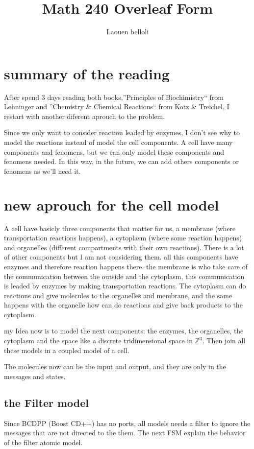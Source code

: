 \documentclass[12pt]{article}
\title{Math 240 Overleaf Form}
\author {Laouen belloli}
\begin{document}
\section*{summary of the reading}
After spend 3 days reading both books,''Principles of Biochimistry`` from Lehninger and ''Chemistry \& Chemical Reactions``  from Kotz \& Treichel, I restart with another diferent aprouch to the problem.

Since we only want to consider reaction leaded by enzymes, I don't see why to model the reactions instead of model the cell components. A cell have many components and fenomens, but we can only model these components and fenomens needed. In this way, in the future, we can add others components or fenomens as we'll need it.


\section*{new aprouch for the cell model}  
A cell have basicly three components that matter for us, a membrane (where transportation reactions happens), a cytoplasm (where some reaction happens) and organelles (different compartments with their own reactions).
There is a lot of other components but I am not considering them.
all this components have enzymes and therefore reaction happens there. the membrane is who take care of the communication between the outside and the cytoplasm, this communication is leaded by enzymes by making transportation reactions. The cytoplasm can do reactions and give molecules to the organelles and membrane, and the same happens with the organelle how can do reactions and give back products to the cytoplasm.

my Idea now is to model the next components: the enzymes, the organelles, the cytoplasm and the space like a discrete tridimensional space in $\mathbb{Z}^3$. Then join all these models in a coupled model of a cell.

The molecules now can be the input and output, and they are only in the messages and states.

\newpage
\subsection*{the Filter model}
Since BCDPP (Boost CD++) has no ports, all models needs a filter to ignore the messages that are not directed to the them.
The next FSM explain the behavior of the filter atomic model.
\end{document}
